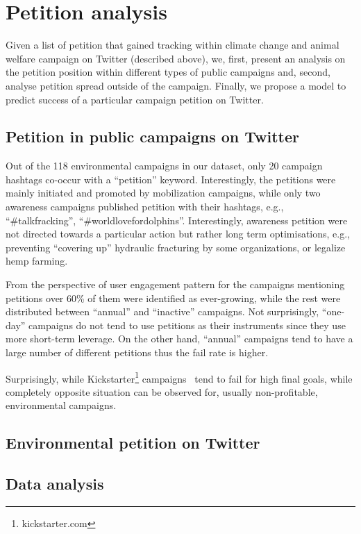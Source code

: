 \section{Petition analysis}
\label{sec:petition_analysis}

Given a list of petition that gained tracking within climate change and animal welfare campaign on Twitter (described above), we, first, present an analysis on the petition position within different types of public campaigns and, second, analyse petition spread outside of the campaign. Finally, we propose a model to predict success of a particular campaign petition on Twitter.

\subsection{Petition in public campaigns on Twitter}

Out of the 118 environmental campaigns in our dataset, only 20 campaign hashtags co-occur with a ``petition'' keyword.
Interestingly, the petitions were mainly initiated and promoted by mobilization campaigns, while only two awareness campaigns published petition with their hashtags, e.g., ``\#talkfracking'', ``\#worldlovefordolphins''. Interestingly, awareness petition were not directed towards a particular action but rather long term optimisations, e.g., preventing ``covering up'' hydraulic fracturing by some organizations, or legalize hemp farming.

From the perspective of user engagement pattern for the campaigns mentioning petitions over 60\% of them were identified as ever-growing, while the rest were distributed between ``annual'' and ``inactive'' campaigns. Not surprisingly, ``one-day'' campaigns do not tend to use petitions as their instruments since they use more short-term leverage. On the other hand, ``annual'' campaigns tend to have a large number of different petitions thus the fail rate is higher.

Surprisingly, while Kickstarter\footnote{kickstarter.com} campaigns~\cite{Etter2013} tend to fail for high final goals, while completely opposite situation can be observed for, usually non-profitable, environmental campaigns.

\subsection{Environmental petition on Twitter}
\jp{\lipsum[1-9]}

\subsection{Data analysis}
\label{sec:discussion}
\jp{\lipsum[1-2]}